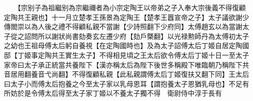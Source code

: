 　　【宗别子為祖繼别為宗繼禰者為小宗定陶王以帝弟之子入奉大宗後義不得復顧定陶共王親也】十一月立楚孝王孫景為定陶王【楚孝王囂宣帝之子】太子議欲謝少傳閻崇以為人後之禮不得顧私親不當謝【少詩照翻下少府同】太傅趙玄以為當謝太子從之詔問所以謝狀尚書劾奏玄左遷少府【劾戶槩翻】以光禄勲師丹為太傅初太子之幼也王祖母傅太后躬自養視【在定陶國時也】及為太子詔傅太后丁姬自居定陶國邸【丁姬事定陶共王實生太子】不得相見頃之王太后欲令傅太后丁姬十日一至太子家帝曰太子承正統當共養陛下【漢亦稱太后為陛下後世多稱殿下唯臨朝乃稱陛下共音居用翻養音弋尚翻】不得復顧私親【此私親謂傅太后丁姬復扶又翻下同】王太后曰太子小而傅太后抱養之今至太子家以乳母恩耳【謂抱養太子恩猶乳母也】不足有所妨於是令傅太后得至太子家丁姬以不養太子獨不得　衛尉侍中淳于長有